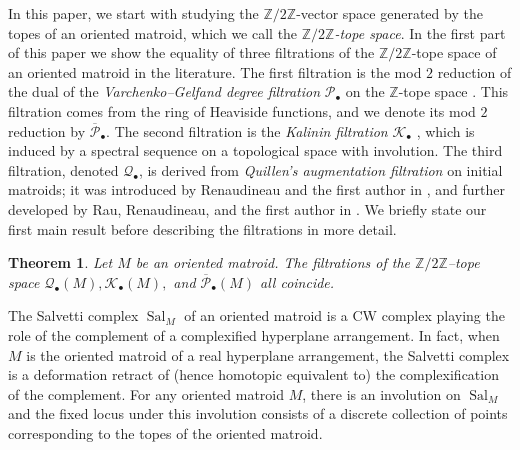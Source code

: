 \documentclass{amsart}
\newcounter{mainTheorem}
\newtheorem{maintheorem}[mainTheorem]{Theorem}
\newcommand\Kcal{{\mathcal K}}
\newcommand\Qcal{{\mathcal Q}}
\newcommand\Pcal{{\mathcal P}}
\newcommand\ZZ{{\mathbb Z}}
\newcommand\Ztwo{{\mathbb Z}/2{\mathbb Z}}
\DeclareMathOperator{\Sal}{Sal}
\begin{document}
In this paper, we start with studying the $\mathbb{Z}/2 \mathbb{Z}$-vector space generated by the topes of an oriented matroid, which we call the {\em $\mathbb{Z}/2 \mathbb{Z}$-tope space}. 
In the first part of this paper we show the equality of three filtrations of the $\Ztwo$-tope space of an oriented matroid in the literature. 
The first filtration is the mod $2$ reduction of the dual of the {\em Varchenko--Gelfand degree filtration} $\Pcal_\bullet$ on the $\ZZ$-tope space \cite{GV87}. This filtration comes from the ring of Heaviside functions, and we denote its mod $2$ reduction by $\overline{\Pcal}_\bullet$. The second filtration is the {\em Kalinin filtration} $\Kcal_\bullet$ \cite{Kalinin}, which is induced by a spectral sequence on a topological space with involution. The third filtration, denoted $\mathcal{Q}_{\bullet}$, is derived from {\em Quillen's augmentation filtration} on initial matroids; it was introduced by Renaudineau and the first author in \cite{RS}, and further developed by Rau, Renaudineau, and the first author in \cite{RRS2}.
We briefly state our first main result before describing the filtrations in more detail.

\begin{maintheorem} \label{mainthm:Z2}
Let $M$ be an oriented matroid.
The filtrations of the $\mathbb{Z}/2\mathbb{Z}$--tope space $\Qcal_{\bullet}(M), \Kcal_{\bullet}(M), $ and $\overline{\Pcal}_{\bullet}(M)$ all coincide.
\end{maintheorem}

The Salvetti complex $\Sal_M$ of an oriented matroid \cite{Sal87} is a CW complex playing the role of the complement of a complexified hyperplane arrangement. In fact, when $M$ is the oriented matroid of a real hyperplane arrangement, the Salvetti complex is a deformation retract of (hence homotopic equivalent to) the complexification of the complement. For any oriented matroid $M$, there is an involution on $\Sal_M$ and the fixed locus under this involution consists of a discrete collection of points corresponding to the topes of the oriented matroid.
\end{document}

